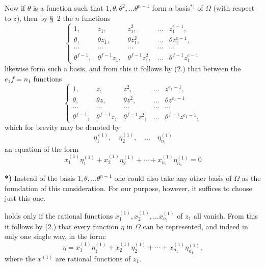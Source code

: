 \documentclass{article}
\begin{document}
Now if $\theta$ is a function such that $1, \theta, \theta^{2}, \ldots \theta^{n-1}$ form a basis${}^{*)}$ of $\Omega$ (with respect to $z$), then by §~2 the $n$ functions
\[ \left\{ \begin{matrix} 1, & z_{1}, & z_{1}^{2}, & \ldots & z_{1}^{e-1}, \\ \theta, & \theta z_{1}, & \theta z_{1}^{2}, & \ldots & \theta z_{1}^{e-1}, \\ \cdots & \cdots & \cdots & \cdots & \cdots \\ \theta^{f-1}, & \theta^{f-1}z_{1}, & \theta^{f-1}z_{1}^{2}, & \ldots & \theta^{f-1}z_{1}^{e-1} \end{matrix} \right. \tag{3.} \]
likewise form such a basis, and from this it follows by (2.) that between the $e_{1}f = n_{1}$ functions
\[ \left\{ \begin{matrix} 1, & z, & z^{2}, & \ldots & z^{e_{1}-1}, \\ \theta, & \theta z, & \theta z^{2}, & \ldots & \theta z^{e_{1}-1} \\ \cdots & \cdots & \cdots & \cdots & \cdots \\ \theta^{f-1}, & \theta^{f-1}z, & \theta^{f-1}z^{2}, & \ldots & \theta^{f-1}z^{e_{1}-1}, \end{matrix} \right. \tag{4.} \]
which for brevity may be denoted by
\[ \eta_{1}^{(1)}, \quad \eta_{2}^{(1)}, \quad \ldots \quad \eta_{n_{1}}^{(1)} \]
an equation of the form
\[ x_{1}^{(1)}\eta_{1}^{(1)} + x_{2}^{(1)}\eta_{2}^{(1)} + \cdots + x_{n_{1}}^{(1)}\eta_{n_{1}}^{(1)} = 0 \]

\textbf{*)} Instead of the basis $1, \theta, \ldots \theta^{n-1}$ one could also take any other basis of $\Omega$ as the foundation of this consideration. For our purpose, however, it suffices to choose just this one.

holds only if the rational functions $x_{1}^{(1)}, x_{2}^{(1)}, \ldots x_{n_{1}}^{(1)}$ of $z_{1}$ all vanish. From this it follows by (2.) that every function $\eta$ in $\Omega$ can be represented, and indeed in only one single way, in the form:
\[ \eta = x_{1}^{(1)}\eta_{1}^{(1)} + x_{2}^{(1)}\eta_{2}^{(1)} + \cdots + x_{n_{1}}^{(1)}\eta_{n_{1}}^{(1)}, \]
where the $x^{(1)}$ are rational functions of $z_{1}$.
\end{document}
